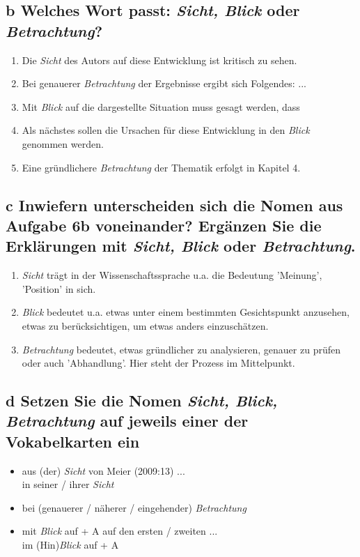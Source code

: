 \documentclass{article}
\begin{document}
	\subsection*{\textbf{b} Welches Wort passt: \textit{Sicht, Blick} oder \textit{Betrachtung}?}
	\begin{enumerate}
		\item{Die \textit{Sicht} des Autors auf diese Entwicklung ist kritisch zu sehen.}
		\item{Bei genauerer \textit{Betrachtung} der Ergebnisse ergibt sich Folgendes: ...}
		\item{Mit \textit{Blick} auf die dargestellte Situation muss gesagt werden, dass}
		\item{Als nächstes sollen die Ursachen für diese Entwicklung in den \textit{Blick} genommen werden.}
		\item{Eine gründlichere \textit{Betrachtung} der Thematik erfolgt in Kapitel 4.}
	\end{enumerate}
	\subsection*{\textbf{c} Inwiefern unterscheiden sich die Nomen aus Aufgabe 6b voneinander? Ergänzen Sie die Erklärungen mit \textit{Sicht, Blick} oder \textit{Betrachtung}.}
	\begin{enumerate}
		\item{\textit{Sicht} trägt in der Wissenschaftssprache u.a. die Bedeutung 'Meinung', 'Position' in sich.}
		\item{\textit{Blick} bedeutet u.a. etwas unter einem bestimmten Gesichtspunkt anzusehen, etwas zu berücksichtigen, um etwas anders einzuschätzen.}
		\item{\textit{Betrachtung} bedeutet, etwas gründlicher zu analysieren, genauer zu prüfen oder auch 'Abhandlung'. Hier steht der Prozess im Mittelpunkt.}
	\end{enumerate}
	\subsection*{\textbf{d} Setzen Sie die Nomen \textit{Sicht, Blick, Betrachtung} auf jeweils einer der Vokabelkarten ein}
	\begin{itemize}
		\item{aus (der) \textit{Sicht} von Meier (2009:13) ... \\ in seiner / ihrer \textit{Sicht}}
		\item{bei (genauerer / näherer / eingehender) \textit{Betrachtung}}
		\item{mit \textit{Blick} auf + A auf den ersten / zweiten ... \\ im (Hin)\textit{Blick} auf + A}	
	\end{itemize}
\end{document}
